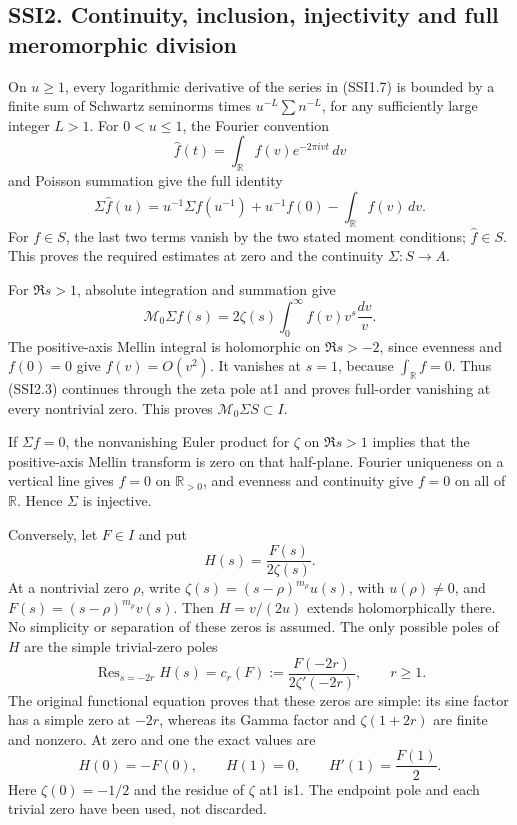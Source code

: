 \subsection{SSI2. Continuity, inclusion, injectivity and full
meromorphic
division}\label{ssi2.-continuity-inclusion-injectivity-and-full-meromorphic-division}

On \(u\ge1\), every logarithmic derivative of the series in (SSI1.7) is
bounded by a finite sum of Schwartz seminorms times
\(u^{-L}\sum n^{-L}\), for any sufficiently large integer \(L>1\). For
\(0<u\le1\), the Fourier convention \[
\widehat f(t)=\int_{\mathbb R}f(v)e^{-2\pi ivt}\,dv
\tag{SSI2.1}
\] and Poisson summation give the full identity \[
\Sigma\widehat f(u)=u^{-1}\Sigma f(u^{-1})
 +u^{-1}f(0)-\int_{\mathbb R}f(v)\,dv.
\tag{SSI2.2}
\] For \(f\in S\), the last two terms vanish by the two stated moment
conditions; \(\widehat f\in S\). This proves the required estimates at
zero and the continuity \(\Sigma:S\to A\).

For \(\Re s>1\), absolute integration and summation give \[
\mathcal M_0\Sigma f(s)=2\zeta(s)\int_0^\infty f(v)v^s\frac{dv}{v}.
\tag{SSI2.3}
\] The positive-axis Mellin integral is holomorphic on \(\Re s>-2\),
since evenness and \(f(0)=0\) give \(f(v)=O(v^2)\). It vanishes at
\(s=1\), because \(\int_{\mathbb R}f=0\). Thus (SSI2.3) continues
through the zeta pole at1 and proves full-order vanishing at every
nontrivial zero. This proves \(\mathcal M_0\Sigma S\subset I\).

If \(\Sigma f=0\), the nonvanishing Euler product for \(\zeta\) on
\(\Re s>1\) implies that the positive-axis Mellin transform is zero on
that half-plane. Fourier uniqueness on a vertical line gives \(f=0\) on
\(\mathbb R_{>0}\), and evenness and continuity give \(f=0\) on all of
\(\mathbb R\). Hence \(\Sigma\) is injective.

Conversely, let \(F\in I\) and put \[
H(s)=\frac{F(s)}{2\zeta(s)}.
\tag{SSI2.4}
\] At a nontrivial zero \(\rho\), write
\(\zeta(s)=(s-\rho)^{m_\rho}u(s)\), with \(u(\rho)\ne0\), and
\(F(s)=(s-\rho)^{m_\rho}v(s)\). Then \(H=v/(2u)\) extends
holomorphically there. No simplicity or separation of these zeros is
assumed. The only possible poles of \(H\) are the simple trivial-zero
poles \[
\operatorname{Res}_{s=-2r}H(s)=c_r(F):=
 \frac{F(-2r)}{2\zeta'(-2r)},\qquad r\ge1.
\tag{SSI2.5}
\] The original functional equation proves that these zeros are simple:
its sine factor has a simple zero at \(-2r\), whereas its Gamma factor
and \(\zeta(1+2r)\) are finite and nonzero. At zero and one the exact
values are \[
H(0)=-F(0),\qquad H(1)=0,\qquad H'(1)=\frac{F(1)}2.
\tag{SSI2.6}
\] Here \(\zeta(0)=-1/2\) and the residue of \(\zeta\) at1 is1. The
endpoint pole and each trivial zero have been used, not discarded.

